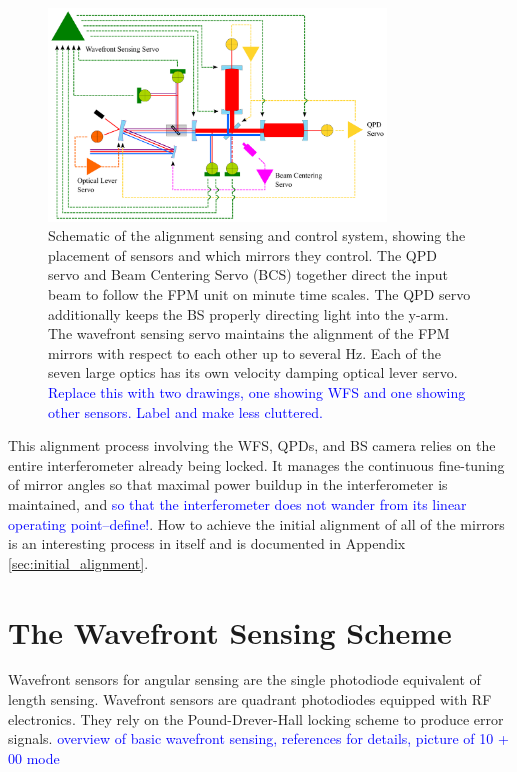 \begin{figure} \begin{centering} \includegraphics[width=0.8\textwidth]{figures/ASClayout_wctrl.pdf} 
\caption[Schematic of the alignment sensing and control system]{Schematic of the alignment sensing and control system, showing the placement of sensors and which mirrors they control. The QPD servo and Beam Centering Servo (BCS) together direct the input beam to follow the FPM unit on minute time scales. The QPD servo additionally keeps the BS properly directing light into the y-arm. The wavefront sensing servo maintains the alignment of the FPM mirrors with respect to each other up to several Hz. Each of the seven large optics has its own velocity damping optical lever servo. \textcolor{blue}{Replace this with two drawings, one showing WFS and one showing other sensors. Label and make less cluttered.}}
\label{fig:ASClayout}
\end{centering}
\end{figure}

This alignment process involving the WFS, QPDs, and BS camera relies on the entire interferometer already being locked. It manages the continuous fine-tuning of mirror angles so that maximal power buildup in the interferometer is maintained, and \textcolor{blue}{so that the interferometer does not wander from its linear operating point--define!}. How to achieve the initial alignment of all of the mirrors is an interesting process in itself and is documented in Appendix \ref{sec:initial_alignment}.




\section{The Wavefront Sensing Scheme}
\label{sec:WFSsensing}
Wavefront sensors for angular sensing are the single photodiode equivalent of length sensing. Wavefront sensors are quadrant photodiodes equipped with RF electronics. They rely on the  Pound-Drever-Hall locking scheme to produce error signals. 
\textcolor{blue}{overview of basic wavefront sensing, references for details, picture of 10 + 00 mode}




